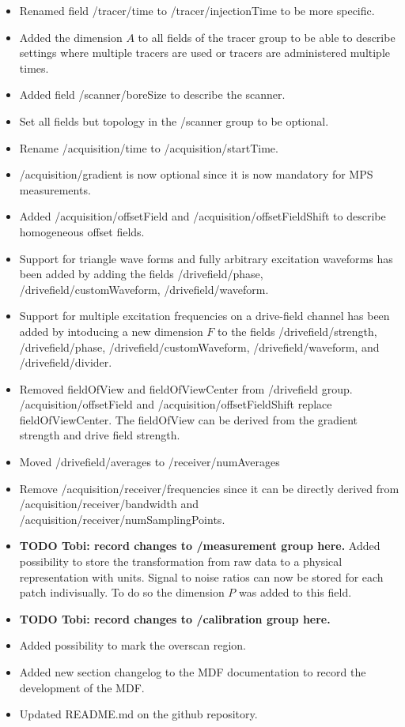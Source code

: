 \documentclass[landscape,a4paper]{article} %
\newcommand{\inlvar}[1]{{\ttfamily#1}}
\begin{document}
\begin{multicols}{2}
\begin{itemize}
	\item Renamed field \inlvar{/tracer/time} to \inlvar{/tracer/injectionTime} to be more specific.
	\item Added the dimension $A$ to all fields of the \inlvar{tracer} group to be able to describe settings where multiple tracers are used or tracers are administered multiple times.
	\item Added field \inlvar{/scanner/boreSize} to describe the scanner.
	\item Set all fields but \inlvar{topology} in the \inlvar{/scanner} group to be optional.
	\item Rename \inlvar{/acquisition/time} to \inlvar{/acquisition/startTime}.
	\item \inlvar{/acquisition/gradient} is now optional since it is now mandatory for MPS measurements.
	\item Added \inlvar{/acquisition/offsetField} and \inlvar{/acquisition/offsetFieldShift} to describe homogeneous offset fields.
	\item Support for triangle wave forms and fully arbitrary excitation waveforms has been added by adding the fields \inlvar{/drivefield/phase}, \inlvar{/drivefield/customWaveform}, \inlvar{/drivefield/waveform}.
	\item Support for multiple excitation frequencies on a drive-field channel has been added by intoducing a new dimension $F$ to the fields \inlvar{/drivefield/strength}, \inlvar{/drivefield/phase}, \inlvar{/drivefield/customWaveform}, \inlvar{/drivefield/waveform}, and \inlvar{/drivefield/divider}.
	\item Removed \inlvar{fieldOfView} and \inlvar{fieldOfViewCenter} from \inlvar{/drivefield} group. \inlvar{/acquisition/offsetField} and \inlvar{/acquisition/offsetFieldShift} replace \inlvar{fieldOfViewCenter}. The \inlvar{fieldOfView} can be derived from the gradient strength and drive field strength.
	\item Moved \inlvar{/drivefield/averages} to \inlvar{/receiver/numAverages}
	\item Remove \inlvar{/acquisition/receiver/frequencies} since it can be directly derived from \inlvar{/acquisition/receiver/bandwidth} and \inlvar{/acquisition/receiver/numSamplingPoints}.
	\item \textbf{TODO Tobi: record changes to \inlvar{/measurement} group here.} Added possibility to store the transformation from raw data to a physical representation with units. Signal to noise ratios can now be stored for each patch indivisually. To do so the dimension $P$ was added to this field.
	\item \textbf{TODO Tobi: record changes to \inlvar{/calibration} group here.}
	\item Added possibility to mark the overscan region.
	\item Added new section changelog to the MDF documentation to record the development of the MDF.
	\item Updated \inlvar{README.md} on the github repository.
\end{itemize}



\end{multicols}
\end{document}
